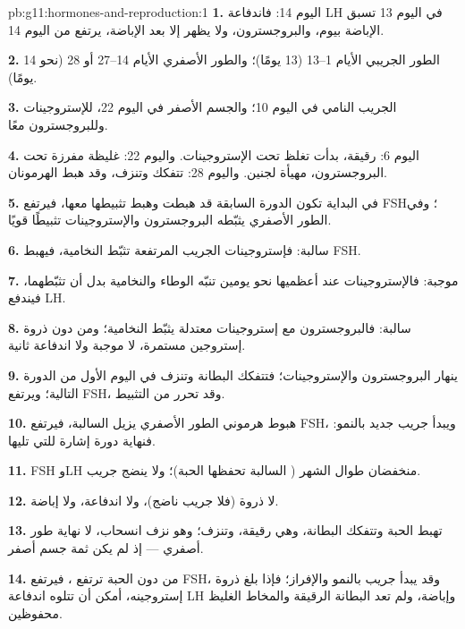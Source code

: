 \begin{solution}{pb:g11:hormones-and-reproduction:1}
\textbf{1.} اليوم 14: فاندفاعة LH في اليوم 13 تسبق الإباضة بيوم،
والبروجسترون، ولا يظهر إلا بعد الإباضة، يرتفع من اليوم 14.

\textbf{2.} الطور الجريبي الأيام 1--13 (13 يومًا)؛ والطور الأصفري
الأيام 14--27 أو 28 (نحو 14 يومًا).

\textbf{3.} الجريب النامي في اليوم 10؛ والجسم الأصفر في اليوم 22،
للإستروجينات وللبروجسترون معًا.

\textbf{4.} اليوم 6: رقيقة، بدأت تغلظ تحت الإستروجينات. واليوم 22:
غليظة مفرزة تحت البروجسترون، مهيأة لجنين. واليوم 28: تتفكك وتنزف، وقد
هبط الهرمونان.

\textbf{5.} في البداية تكون  الدورة السابقة قد هبطت وهبط
تثبيطها معها، فيرتفع FSH؛ وفي الطور الأصفري يثبّطه البروجسترون
والإستروجينات تثبيطًا قويًا.

\textbf{6.}  سالبة: فإستروجينات الجريب المرتفعة تثبّط
النخامية، فيهبط FSH.

\textbf{7.}  موجبة: فالإستروجينات عند أعظميها نحو يومين
تنبّه الوطاء والنخامية بدل أن تثبّطهما، فيندفع LH.

\textbf{8.} سالبة: فالبروجسترون مع إستروجينات معتدلة يثبّط النخامية؛
ومن دون ذروة إستروجين مستمرة، لا  موجبة ولا اندفاعة ثانية.

\textbf{9.} ينهار البروجسترون والإستروجينات؛ فتتفكك البطانة وتنزف في
اليوم الأول من الدورة التالية؛ ويرتفع FSH، وقد تحرر من التثبيط.

\textbf{10.} هبوط هرموني الطور الأصفري يزيل  السالبة،
فيرتفع FSH، ويبدأ جريب جديد بالنمو: فنهاية دورة إشارة للتي تليها.

\textbf{11.} FSH وLH منخفضان طوال الشهر ( السالبة
تحفظها  الحبة)؛ ولا ينضج جريب.

\textbf{12.} لا ذروة (فلا جريب ناضج)، ولا اندفاعة، ولا إباضة.

\textbf{13.} تهبط  الحبة وتتفكك البطانة، وهي رقيقة، وتنزف؛ وهو
نزف انسحاب، لا نهاية طور أصفري --- إذ لم يكن ثمة جسم أصفر.

\textbf{14.} من دون  الحبة ترتفع ، فيرتفع FSH،
وقد يبدأ جريب بالنمو والإفراز؛ فإذا بلغ ذروة إستروجينه، أمكن أن تتلوه
اندفاعة LH وإباضة، ولم تعد البطانة الرقيقة والمخاط الغليظ محفوظين.


\end{solution}
